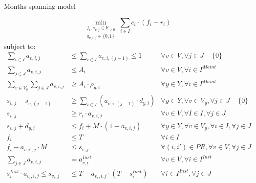 \documentclass{beamer}
\newcommand{\smalld}{\tiny}
\begin{document}
\begin{frame}{Months spanning model}
\smalld

\begin{equation}
	\min_{\substack{f_i, s_{v,j} \in \mathbb{R}_{\geq 0} \\ 
	a_{v,i,j} \in \{0, 1\}}} 
	\sum_{i \in I} c_i \cdot (f_i - r_i)
\end{equation}
subject to:
\begin{align}
\sum_{i \in I} a_{v,i,j}							&\leq	\sum_{i \in I} a_{v,i,(j-1)}	\leq	1		&\forall v \in V, \forall j \in J - \{ 0 \}			\\
\sum_{j \in J} a_{v,i,j}							&\leq	A_i							&\forall v \in V,\forall i \in I^{Maint} 			\\
\sum_{v \in V_y} \sum_{j \in J} a_{v, i, j}				&\geq	A_i \cdot \rho_{y,i}  				& \forall y \in Y, \forall i \in I^{Maint} 			\\
s_{v,j} - s_{v,(j-1)}							&\geq	\sum_{i \in I} (a_{v,i,(j-1)} \cdot d_{y,i})	& \forall y \in Y, \forall v \in V_y, \forall j \in J - \{ 0 \}	\\
s_{v,j}									&\geq r_i \cdot a_{v,i,j} 					& \forall v \in V, \forall I \in I, \forall j \in J		\\
s_{v,j} + d_{y,i}								&\leq f_i + M \cdot (1 - a_{v,i,j})			& \forall y \in Y, \forall v \in V_y, \forall i \in I, \forall j \in J 	\\
f_i 										&\leq	T							& \forall i \in I 						\\
f_i - a_{v, i', j} \cdot M							&\leq s_{v,j}							& \forall (i, i') \in PR, \forall v \in V, \forall j \in J 	\\
\sum_{j \in J} a_{v,i,j}							&=	a^{Inst}_{v,i}					& \forall v \in V, \forall i \in I^{Inst}  			\\
s^{Inst}_i \cdot a_{v_i,i,j}	\leq	s_{v_i,j}			&\leq	T - a_{v_i,i,j} \cdot (T - s^{Inst}_i)		& \forall i \in I^{Inst}, \forall j \in J			
\end{align}

\end{frame}
\end{document}
